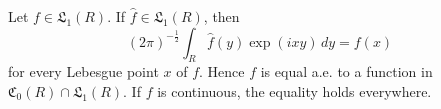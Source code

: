 Let $f \in \mathfrak{L}_1(R)$. If $\hat{f} \in \mathfrak{L}_1(R)$, then
$$(2\pi)^{-\frac{1}{2}} \int_R \hat{f}(y) \exp(ixy) \, dy = f(x)$$
for every Lebesgue point $x$ of $f$. Hence $f$ is equal a.e. to a function in $\mathfrak{C}_0(R) \cap \mathfrak{L}_1(R)$. If $f$ is continuous, the equality holds everywhere.
